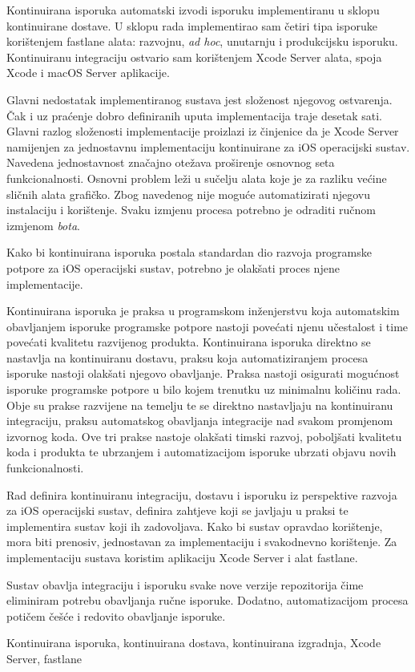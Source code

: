 \documentclass[times, utf8, diplomski, numeric]{fer}
\begin{document}
Kontinuirana isporuka automatski izvodi isporuku implementiranu u sklopu kontinuirane dostave. U sklopu rada implementirao sam četiri tipa isporuke korištenjem fastlane alata: razvojnu, \textit{ad hoc}, unutarnju i produkcijsku isporuku. Kontinuiranu integraciju ostvario sam korištenjem Xcode Server alata, spoja Xcode i macOS Server aplikacije.

Glavni nedostatak implementiranog sustava jest složenost njegovog ostvarenja. Čak i uz praćenje dobro definiranih uputa implementacija traje desetak sati. Glavni razlog složenosti implementacije proizlazi iz činjenice da je Xcode Server namijenjen za jednostavnu implementaciju kontinuirane za iOS operacijski sustav. Navedena jednostavnost značajno otežava proširenje osnovnog seta funkcionalnosti. Osnovni problem leži u sučelju alata koje je za razliku većine sličnih alata grafičko. Zbog navedenog nije moguće automatizirati njegovu instalaciju i korištenje. Svaku izmjenu procesa potrebno je odraditi ručnom izmjenom \textit{bota}.

Kako bi kontinuirana isporuka postala standardan dio razvoja programske potpore za iOS operacijski sustav, potrebno je olakšati proces njene implementacije.







\begin{sazetak}

Kontinuirana isporuka je praksa u programskom inženjerstvu koja automatskim obavljanjem isporuke programske potpore nastoji povećati njenu učestalost i time povećati kvalitetu razvijenog produkta. Kontinuirana isporuka direktno se nastavlja na kontinuiranu dostavu, praksu koja automatiziranjem procesa isporuke nastoji olakšati njegovo obavljanje. Praksa nastoji osigurati mogućnost isporuke programske potpore u bilo kojem trenutku uz minimalnu količinu rada. Obje su prakse razvijene na temelju te se direktno nastavljaju na kontinuiranu integraciju, praksu automatskog obavljanja integracije nad svakom promjenom izvornog koda. Ove tri prakse nastoje olakšati timski razvoj, poboljšati kvalitetu koda i produkta te ubrzanjem i automatizacijom isporuke ubrzati objavu novih funkcionalnosti.

Rad definira kontinuiranu integraciju, dostavu i isporuku iz perspektive razvoja za iOS operacijski sustav, definira zahtjeve koji se javljaju u praksi te implementira sustav koji ih zadovoljava. Kako bi sustav opravdao korištenje, mora biti prenosiv, jednostavan za implementaciju i svakodnevno korištenje. Za implementaciju sustava koristim aplikaciju Xcode Server i alat fastlane.

Sustav obavlja integraciju i isporuku svake nove verzije repozitorija čime eliminiram potrebu obavljanja ručne isporuke. Dodatno, automatizacijom procesa potičem češće i redovito obavljanje isporuke.

\kljucnerijeci{}

Kontinuirana isporuka, kontinuirana dostava, kontinuirana izgradnja, Xcode Server, fastlane

\end{sazetak}
\end{document}
